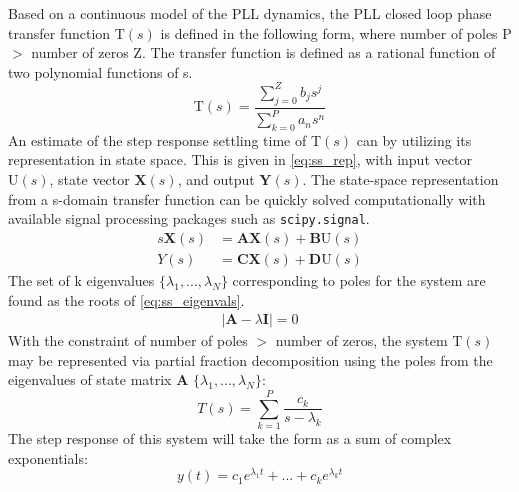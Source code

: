 	Based on a continuous model of the PLL dynamics, the PLL closed loop phase transfer function $\mathrm{T}(s)$ is defined in the following form, where number of poles P $>$ number of zeros Z. The transfer function is defined as a rational function of two polynomial functions of s. 
	\begin{equation}\label{eq:pll_cl_tf}
	\mathrm{T}(s) = \frac{\sum_{j=0}^Z b_js^j}{\sum_{k=0}^P a_ns^n}
	\end{equation}
	An estimate of the step response settling time of $\mathrm{T}(s)$ can by utilizing its representation in state space. This is given in \ref{eq:ss_rep}, with input vector $\mathrm{U}(s)$, state vector $\mathbf{X}(s)$,  and output $\mathbf{Y}(s)$. The state-space representation from a s-domain transfer function can be quickly solved computationally with available signal processing packages such as \texttt{scipy.signal}.
	\begin{align} \label{eq:ss_rep}
		s\mathbf{X}(s) &= \mathbf{AX}(s) +\mathbf{B}\mathrm{U}(s)\\
		Y(s) &= \mathbf{CX}(s) +\mathbf{D}\mathrm{U}(s)
	\end{align}
	The set of k eigenvalues $\{\lambda_1, ... , \lambda_{N}\}$ corresponding to poles for the system are found as the roots of \ref{eq:ss_eigenvals}.%
	\begin{align}
		|\mathbf{A} - \lambda \mathbf{I}| = 0\label{eq:ss_eigenvals}%
	\end{align}
	With the constraint of number of poles $>$ number of zeros, the system $\mathrm{T}(s)$ may be represented via partial fraction decomposition using the poles from the eigenvalues of state matrix $\mathbf{A}$ $\{\lambda_1, ... , \lambda_{N}\}$:
	\begin{equation}
		T(s) = \sum_{k=1}^{P} \frac{c_k}{s-\lambda_k}
	\end{equation}
	The step response of this system will take the form as a sum of complex exponentials:
	\begin{equation}
		y(t) = c_1e^{\lambda_1t} + ... + c_ke^{\lambda_kt}%
	\end{equation}

